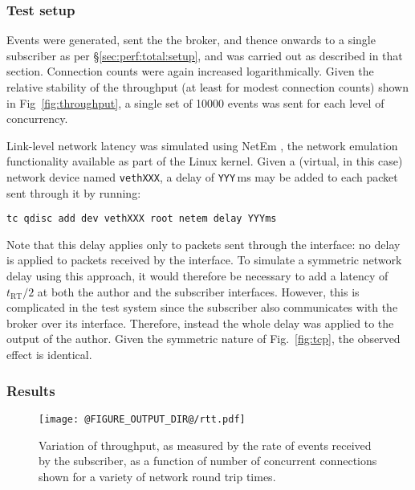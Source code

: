 \documentclass[5p,authoryear]{elsarticle}
\begin{document}
\subsubsection{Test setup}

Events were generated, sent the the broker, and thence onwards to a single
subscriber as per \S\ref{sec:perf:total:setup}, and was carried out as
described in that section. Connection counts were again increased
logarithmically.  Given the relative stability of the throughput (at least for
modest connection counts) shown in Fig~\ref{fig:throughput}, a single set of
10000 events was sent for each level of concurrency.

Link-level network latency was simulated using NetEm \citep{Hemminger:2005},
the network emulation functionality available as part of the Linux kernel.
Given a (virtual, in this case) network device named \texttt{vethXXX}, a
delay of \texttt{YYY}\,ms may be added to each packet sent through it by
running:
\begin{verbatim}
tc qdisc add dev vethXXX root netem delay YYYms
\end{verbatim}
Note that this delay applies only to packets sent through the interface: no
delay is applied to packets received by the interface. To simulate a symmetric
network delay using this approach, it would therefore be necessary to add a
latency of $t_\mathrm{RT} / 2$ at both the author and the subscriber
interfaces. However, this is complicated in the test system since the
subscriber also communicates with the broker over its interface. Therefore,
instead the whole delay was applied to the output of the author. Given the
symmetric nature of Fig.~\ref{fig:tcp}, the observed effect is identical.

\subsubsection{Results}

\begin{figure}
  \begin{center}
  \texttt{[image: @FIGURE\_OUTPUT\_DIR@/rtt.pdf]}
  \end{center}

  \caption{Variation of throughput, as measured by the rate of events received
  by the subscriber, as a function of number of concurrent connections shown
  for a variety of network round trip times.}

  \label{fig:rtt}
\end{figure}
\end{document}
